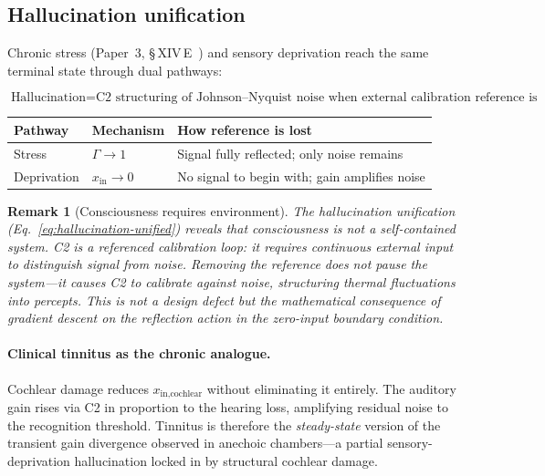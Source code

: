 \documentclass[aps,pre,twocolumn,superscriptaddress,floatfix]{revtex4-2}
\newtheorem{remark}{Remark}
\begin{document}
\subsection{Hallucination unification}
\label{sec:hallucination-unification}

Chronic stress (Paper~3, \S\,XIV\,E~\cite{Paper3}) and
sensory deprivation reach the same terminal state through
dual pathways:

\begin{equation}
  \boxed{
  \text{Hallucination}
  = \text{C2 structuring of Johnson--Nyquist noise
         when external calibration reference is absent}
  }
  \label{eq:hallucination-unified}
\end{equation}

\begin{center}
\begin{tabular}{@{}lll@{}}
\toprule
Pathway & Mechanism & How reference is lost \\
\midrule
Stress & $\Gamma \to 1$ &
  Signal fully reflected; only noise remains \\
Deprivation & $x_{\text{in}} \to 0$ &
  No signal to begin with; gain amplifies noise \\
\bottomrule
\end{tabular}
\end{center}

\begin{remark}[Consciousness requires environment]
\label{rem:consciousness-environment}
The hallucination unification
(Eq.~\ref{eq:hallucination-unified}) reveals that
consciousness is not a self-contained system.
C2 is a \emph{referenced} calibration loop:
it requires continuous external input to distinguish
signal from noise.
Removing the reference does not pause the
system---it causes C2 to calibrate \emph{against noise},
structuring thermal fluctuations into percepts.
This is not a design defect but the mathematical
consequence of gradient descent on the reflection
action in the zero-input boundary condition.
\end{remark}

\paragraph{Clinical tinnitus as the chronic analogue.}
Cochlear damage reduces $x_{\text{in,cochlear}}$ without
eliminating it entirely.
The auditory gain rises via C2 in proportion to the
hearing loss, amplifying residual noise to the
recognition threshold.
Tinnitus is therefore the \emph{steady-state} version of
the transient gain divergence observed in anechoic
chambers---a partial sensory-deprivation hallucination
locked in by structural cochlear damage.
\end{document}
